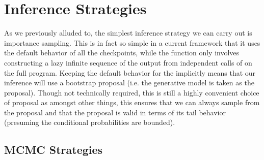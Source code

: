
\section{Inference Strategies}
\label{sec:proginf:str}


As we previously alluded to, the simplest inference strategy we can carry out is importance
sampling.  This is in fact so simple in a current framework that it uses the default behavior
of all the checkpoints, while the \anginfer function only involves constructing a lazy infinite
sequence of the output from independent calls of  on the full program.
Keeping the default behavior for the \sample implicitly means that our
inference will use a bootstrap proposal (i.e. the generative model is taken as the proposal).
Though not technically required, this is still a highly convenient choice of proposal as
amongst other things, this ensures that we can always sample from the proposal and
that the proposal is valid in terms of its tail behavior (presuming the conditional probabilities
are bounded).

\subsection{MCMC Strategies}
\label{sec:proginf:str:lmh}

